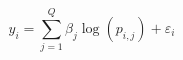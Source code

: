 \documentclass[10pt]{article}
\begin{document}
\[y_i = \sum_{j=1}^Q \beta_j \log(p_{i,j}) + \varepsilon_i\]
\end{document}
